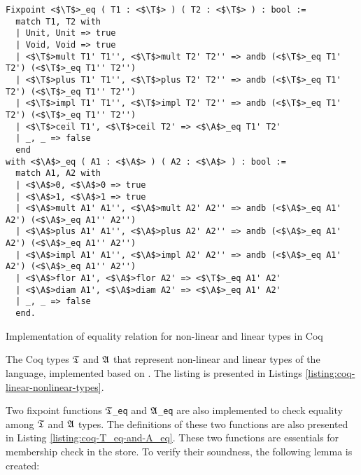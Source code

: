 \begin{listing}[t]
\begin{verbatim}
Fixpoint <$\T$>_eq ( T1 : <$\T$> ) ( T2 : <$\T$> ) : bool :=
  match T1, T2 with
  | Unit, Unit => true
  | Void, Void => true
  | <$\T$>mult T1' T1'', <$\T$>mult T2' T2'' => andb (<$\T$>_eq T1' T2') (<$\T$>_eq T1'' T2'')
  | <$\T$>plus T1' T1'', <$\T$>plus T2' T2'' => andb (<$\T$>_eq T1' T2') (<$\T$>_eq T1'' T2'')
  | <$\T$>impl T1' T1'', <$\T$>impl T2' T2'' => andb (<$\T$>_eq T1' T2') (<$\T$>_eq T1'' T2'')
  | <$\T$>ceil T1', <$\T$>ceil T2' => <$\A$>_eq T1' T2'
  | _, _ => false
  end
with <$\A$>_eq ( A1 : <$\A$> ) ( A2 : <$\A$> ) : bool :=
  match A1, A2 with
  | <$\A$>0, <$\A$>0 => true
  | <$\A$>1, <$\A$>1 => true
  | <$\A$>mult A1' A1'', <$\A$>mult A2' A2'' => andb (<$\A$>_eq A1' A2') (<$\A$>_eq A1'' A2'')
  | <$\A$>plus A1' A1'', <$\A$>plus A2' A2'' => andb (<$\A$>_eq A1' A2') (<$\A$>_eq A1'' A2'')
  | <$\A$>impl A1' A1'', <$\A$>impl A2' A2'' => andb (<$\A$>_eq A1' A2') (<$\A$>_eq A1'' A2'')
  | <$\A$>flor A1', <$\A$>flor A2' => <$\T$>_eq A1' A2'
  | <$\A$>diam A1', <$\A$>diam A2' => <$\A$>_eq A1' A2'
  | _, _ => false
  end.
\end{verbatim}
\caption{Implementation of equality relation for non-linear and linear types in Coq}
\label{listing:coq-T_eq-and-A_eq}
\end{listing}

The Coq types $\mathfrak{T}$ and $\mathfrak{A}$ that represent non-linear and linear types of the language, implemented based on . The listing is presented in Listings \ref{listing:coq-linear-nonlinear-types}.


Two fixpoint functions $\mathfrak{T}$\texttt{\_eq} and $\mathfrak{A}$\texttt{\_eq} are also implemented to check equality among $\mathfrak{T}$ and $\mathfrak{A}$ types. The definitions of these two functions are also presented in Listing \ref{listing:coq-T_eq-and-A_eq}. These two functions are essentials for membership check in the store. To verify their soundness, the following lemma is created:


